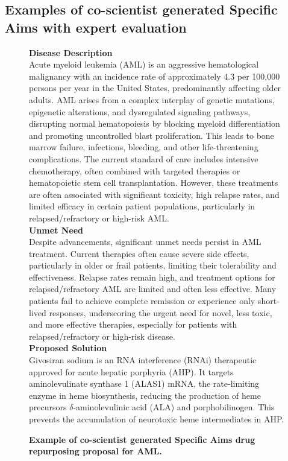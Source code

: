 \newpage

\vspace{-0.2cm}
\subsection{Examples of co-scientist generated Specific Aims with expert evaluation}
\label{sec:ex_specific_aims}

\vspace{-0.2cm}
\begin{figure}[htbp!]
\caption{\textbf{Example of co-scientist generated Specific Aims drug repurposing proposal for AML.}}
\label{fig:aim1_1}
\vspace{0.1cm}
\begin{tcolorbox}[title=Givosiran for AML]
\footnotesize
\textbf{Disease Description}\\
Acute myeloid leukemia (AML) is an aggressive hematological malignancy with an incidence rate of approximately 4.3 per 100,000 persons per year in the United States, predominantly affecting older adults.  AML arises from a complex interplay of genetic mutations, epigenetic alterations, and dysregulated signaling pathways, disrupting normal hematopoiesis by blocking myeloid differentiation and promoting uncontrolled blast proliferation.  This leads to bone marrow failure, infections, bleeding, and other life-threatening complications.  The current standard of care includes intensive chemotherapy, often combined with targeted therapies or hematopoietic stem cell transplantation.  However, these treatments are often associated with significant toxicity, high relapse rates, and limited efficacy in certain patient populations, particularly in relapsed/refractory or high-risk AML.\\

\textbf{Unmet Need}\\
Despite advancements, significant unmet needs persist in AML treatment.  Current therapies often cause severe side effects, particularly in older or frail patients, limiting their tolerability and effectiveness.  Relapse rates remain high, and treatment options for relapsed/refractory AML are limited and often less effective.  Many patients fail to achieve complete remission or experience only short-lived responses, underscoring the urgent need for novel, less toxic, and more effective therapies, especially for patients with relapsed/refractory or high-risk disease.\\

\textbf{Proposed Solution}\\
Givosiran sodium is an RNA interference (RNAi) therapeutic approved for acute hepatic porphyria (AHP). It targets aminolevulinate synthase 1 (ALAS1) mRNA, the rate-limiting enzyme in heme biosynthesis, reducing the production of heme precursors $\delta$-aminolevulinic acid (ALA) and porphobilinogen. This prevents the accumulation of neurotoxic heme intermediates in AHP.


\end{tcolorbox}
\end{figure}
